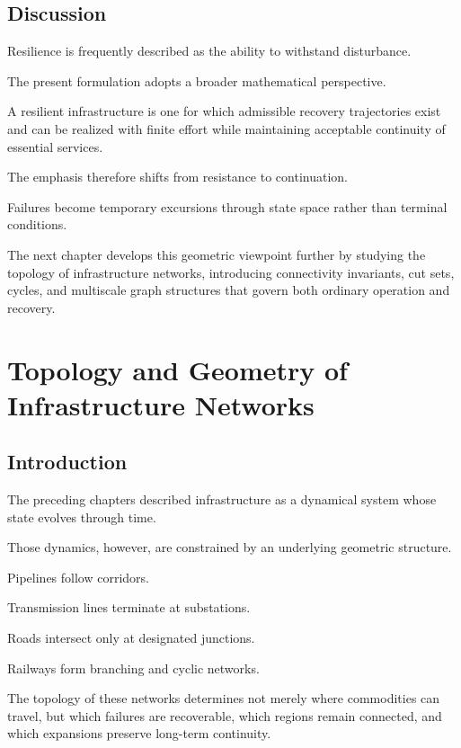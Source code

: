 \documentclass[11pt,fleqn]{book}
\numberwithin{equation}{chapter}
\theoremstyle{plain}
\theoremstyle{definition}
\theoremstyle{remark}
\begin{document}

\section{Discussion}

Resilience is frequently described as the ability to withstand
disturbance.

The present formulation adopts a broader mathematical perspective.

A resilient infrastructure is one for which admissible recovery
trajectories exist and can be realized with finite effort while
maintaining acceptable continuity of essential services.

The emphasis therefore shifts from resistance to continuation.

Failures become temporary excursions through state space rather than
terminal conditions.

The next chapter develops this geometric viewpoint further by studying
the topology of infrastructure networks, introducing connectivity
invariants, cut sets, cycles, and multiscale graph structures that
govern both ordinary operation and recovery.

\chapter{Topology and Geometry of Infrastructure Networks}

\section{Introduction}

The preceding chapters described infrastructure as a dynamical system
whose state evolves through time.

Those dynamics, however, are constrained by an underlying geometric
structure.

Pipelines follow corridors.

Transmission lines terminate at substations.

Roads intersect only at designated junctions.

Railways form branching and cyclic networks.

The topology of these networks determines not merely where commodities
can travel, but which failures are recoverable, which regions remain
connected, and which expansions preserve long-term continuity.
\end{document}
